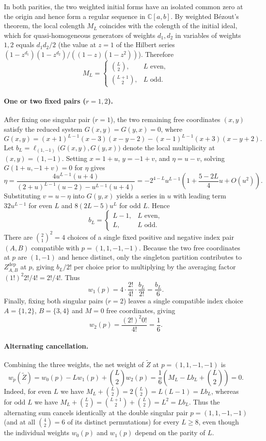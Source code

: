 \documentclass[11pt]{article}
\theoremstyle{definition}
\newcommand{\C}{\mathbb{C}}
\begin{document}
In both parities, the two weighted initial forms have an isolated common zero at the origin and hence form a regular
sequence in $\C[a,b]$. By weighted B\'ezout's theorem, the local colength $M_L$ coincides with the colength of the initial ideal, which for quasi-homogeneous generators of weights
$d_1,d_2$ in variables of weights $1,2$ equals
$d_1 d_2/2$ (the value at $z=1$ of the Hilbert series
$(1-z^{d_1})(1-z^{d_2})/((1-z)(1-z^2))$). Therefore
\[
 M_L=\begin{cases}
 \binom{L}{2}, & L\text{ even},\\[4pt]
 \binom{L+1}{2}, & L\text{ odd}.
 \end{cases}
\]

\paragraph{One or two fixed pairs ($r=1,2$).}
After fixing one singular pair ($r=1$), the two remaining free coordinates $(x,y)$ satisfy the reduced system
$G(x,y)=G(y,x)=0$, where
\[
 G(x,y)=(x+1)^{L-1}(x-3)(x-y-2)
        -(x-1)^{L-1}(x+3)(x-y+2).
\]
Let $b_L=\ell_{(1,-1)}\bigl(G(x,y),G(y,x)\bigr)$ denote the local multiplicity at $(x,y)=(1,-1)$. Setting $x=1+u$,
$y=-1+v$, and $\eta=u-v$, solving $G(1+u,-1+v)=0$ for $\eta$ gives
\[
 \eta=\frac{4u^{L-1}(u+4)}
 {(2+u)^{L-1}(u-2)-u^{L-1}(u+4)}
 =-2^{4-L}u^{L-1}\left(1+\frac{5-2L}{4}u+O(u^2)\right).
\]
Substituting $v=u-\eta$ into $G(y,x)$ yields a series in $u$ with leading term
$32u^{L-1}$ for even $L$ and $8(2L-5)u^L$ for odd $L$. Hence
\[
 b_L=\begin{cases}
 L-1, & L\text{ even},\\
 L, & L\text{ odd}.
 \end{cases}
\]
There are $\binom{2}{1}^2=4$ choices of a single fixed positive and negative index pair $(A,B)$ compatible with $p=(1,1,-1,-1)$. Because the two free coordinates at $p$ are $(1,-1)$ and hence distinct, only the singleton partition contributes to $Z^{\mathrm{dep}}_{A,B}$ at $p$, giving $b_L/2!$ per choice prior to multiplying by the averaging factor $(1!)^2 2!/4!=2!/4!$.
Thus
\[
 w_1(p)=4\cdot\frac{2!}{4!}\cdot\frac{b_L}{2!}=\frac{b_L}{6}.
\]
Finally, fixing both singular pairs ($r=2$) leaves a single compatible index choice $A=\{1,2\}$, $B=\{3,4\}$ and $M=0$ free coordinates, giving
\[
 w_2(p)=\frac{(2!)^2 0!}{4!}=\frac{1}{6}.
\]

\paragraph{Alternating cancellation.}
Combining the three weights, the net weight of $\tilde{Z}$ at $p=(1,1,-1,-1)$ is
\[
 w_p(\tilde{Z})=w_0(p)-Lw_1(p)+\binom{L}{2}w_2(p)
 =\frac{1}{6}\left(M_L-Lb_L+\binom{L}{2}\right)=0.
\]
Indeed, for even $L$ we have $M_L+\binom{L}{2}=2\binom{L}{2}=L(L-1)=Lb_L$, whereas
for odd $L$ we have $M_L+\binom{L}{2}=\binom{L+1}{2}+\binom{L}{2}=L^2=Lb_L$. Thus the alternating sum cancels identically
at the double singular pair $p=(1,1,-1,-1)$ (and at all $\binom{4}{2}=6$ of its distinct permutations) for every $L\ge 8$,
even though the individual weights $w_0(p)$ and $w_1(p)$ depend on the parity of $L$.
\end{document}
